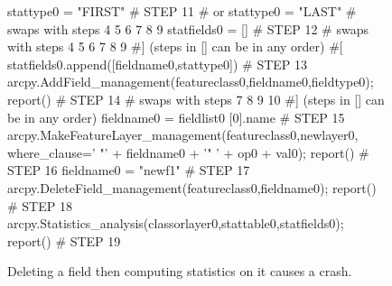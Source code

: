 \begin{figure}
{\begin{code}
stattype0 = "FIRST"                                                           \textcolor{black!60}{\# STEP 11}
\textcolor{black!60}{\#  or stattype0 = "LAST" }
\textcolor{black!60}{\#  swaps with steps 4 5 6 7 8 9}
statfields0 = []                                                              \textcolor{black!60}{\# STEP 12}
\textcolor{black!60}{\#  swaps with steps 4 5 6 7 8 9}
\textcolor{black!60}{\#] (steps in [] can be in any order)}
\textcolor{black!60}{\#[}
statfields0.append([fieldname0,stattype0])                                    \textcolor{black!60}{\# STEP 13}
arcpy.AddField\_management(featureclass0,fieldname0,fieldtype0); report()      \textcolor{black!60}{\# STEP 14}
\textcolor{black!60}{\#  swaps with steps 7 8 9 10}
\textcolor{black!60}{\#] (steps in [] can be in any order)}
fieldname0 = fieldlist0 [0].name \textcolor{black!60}{\# STEP 15}
arcpy.MakeFeatureLayer\_management(featureclass0,newlayer0,
   where\_clause=' "' + fieldname0 + '" ' + op0 + val0); report()              \textcolor{black!60}{\# STEP 16}
fieldname0 = "newf1"                                                          \textcolor{black!60}{\# STEP 17}
arcpy.DeleteField\_management(featureclass0,fieldname0); report()              \textcolor{black!60}{\# STEP 18}
arcpy.Statistics\_analysis(classorlayer0,stattable0,statfields0); report()     \textcolor{black!60}{\# STEP 19}
\end{code}
}
\caption{Deleting a field then computing statistics on it causes a crash.}
\label{fault2}
\end{figure}

